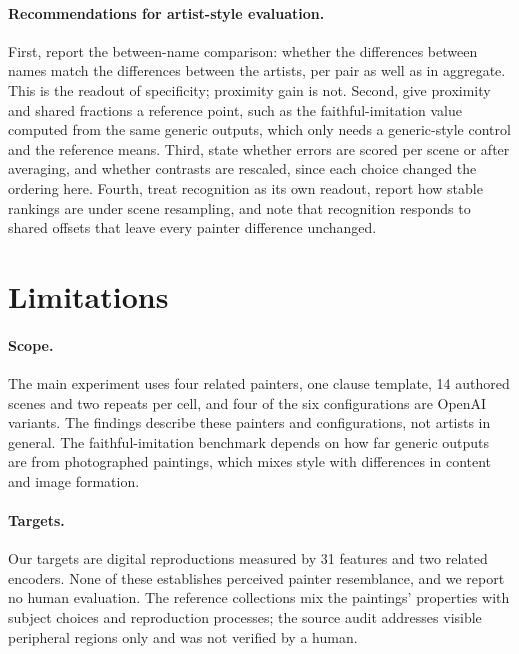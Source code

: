 \documentclass[10pt]{article}
\begin{document}
\paragraph{Recommendations for artist-style evaluation.}
First, report the between-name comparison: whether the differences between names match the
differences between the artists, per pair as well as in aggregate. This is the readout of
specificity; proximity gain is not. Second, give proximity and shared fractions a reference
point, such as the faithful-imitation value computed from the same generic outputs, which only
needs a generic-style control and the reference means. Third, state whether errors are scored
per scene or after averaging, and whether contrasts are rescaled, since each choice changed the
ordering here. Fourth, treat recognition as its own readout, report how stable rankings are
under scene resampling, and note that recognition responds to shared offsets that leave every
painter difference unchanged.

\section{Limitations}\label{sec:limitations}

\paragraph{Scope.} The main experiment uses four related painters, one clause template, 14
authored scenes and two repeats per cell, and four of the six configurations are OpenAI
variants. The findings describe these painters and configurations, not artists in general. The
faithful-imitation benchmark depends on how far generic outputs are from photographed
paintings, which mixes style with differences in content and image formation.

\paragraph{Targets.} Our targets are digital reproductions measured by 31 features and two
related encoders. None of these establishes perceived painter resemblance, and we report no
human evaluation. The reference collections mix the paintings' properties with subject choices
and reproduction processes; the source audit addresses visible peripheral regions only and was
not verified by a human.
\end{document}
